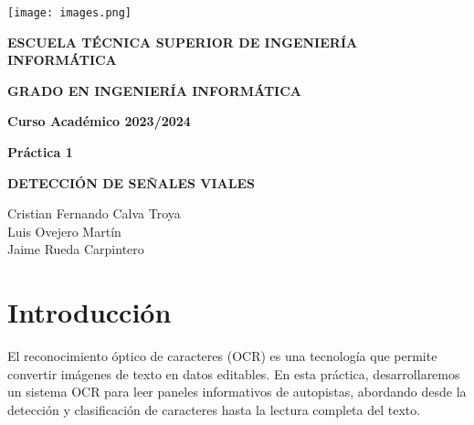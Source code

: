 \documentclass[a4paper, 12pt]{article}
\begin{document}
\begin{titlepage}
	\begin{center}
		\texttt{[image: images.png]}
		\vspace{1.75cm}
		
		\large
		\textbf{ESCUELA TÉCNICA SUPERIOR DE INGENIERÍA INFORMÁTICA}
		\vspace{1cm}
		
		\large
		\textbf{GRADO EN INGENIERÍA INFORMÁTICA}
		
		
		
		\large
		\textbf{Curso Académico 2023/2024}
		
		\vspace{1cm}
		\large
		\textbf{Práctica 1}
		
		\vspace{2cm}
		
		\large
		\textbf{DETECCIÓN DE SEÑALES VIALES}
		
		\vspace{2cm}
		
		\large
		Cristian Fernando Calva Troya \\
		Luis Ovejero Martín \\
		Jaime Rueda Carpintero
		\vspace{1cm}
	\end{center}
\end{titlepage}

\newpage
\thispagestyle{empty} 
\mbox{} 

\newpage
\newpage
\listoffigures
\newpage

{\small
	\tableofcontents 
}
\newpage

\section{Introducción}
El reconocimiento óptico de caracteres (OCR) es una tecnología que permite convertir imágenes de texto en datos editables. En esta práctica, desarrollaremos un sistema OCR para leer paneles informativos de autopistas, abordando desde la detección y clasificación de caracteres hasta la lectura completa del texto.
\end{document}

